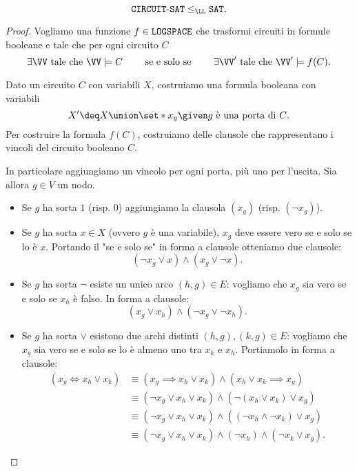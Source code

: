 \begin{theorem}
  \[
    \CSAT \leq_{\LL} \SAT.
  \]
\end{theorem}
\begin{proof}
  Vogliamo una funzione $f \in \texttt{LOGSPACE}$ che trasformi circuiti in formule booleane
  e tale che per ogni circuito $C$ \[
      \exists \VV \text{ tale che } \VV \models C 
      \qquad \text{ se e solo se } \qquad
      \exists \VV' \text{ tale che } \VV' \models f(C).
  \]

  Dato un circuito $C$ con variabili $X$, costruiamo una formula booleana con
  variabili \[
      X' \deq X \union \set*{x_g \given g \text{ è una porta di } C}.
  \] Per costruire la formula $f(C)$, costruiamo delle clausole che rappresentano
  i vincoli del circuito booleano $C$. 
  
  In particolare aggiungiamo un vincolo per ogni porta, più uno per l'uscita.
  Sia allora $g \in V$ un nodo.
  \begin{itemize}
    \item Se $g$ ha sorta $1$ (risp. $0$) aggiungiamo la clausola $(x_g)$
      (risp. $(\neg x_g)$).
    \item Se $g$ ha sorta $x \in X$ (ovvero $g$ è una variabile), $x_g$ deve 
      essere vero se e solo se lo è $x$. Portando il "se e solo se" in forma a
      clausole otteniamo due clausole: \[
          (\neg x_g \lor x) \land (x_g \lor \neg x).
      \]
    \item Se $g$ ha sorta $\neg$ esiste un unico arco $(h, g) \in E$: vogliamo
      che $x_g$ sia vero se e solo se $x_h$ è falso. In forma a clausole: \[
          (x_g \lor x_h) \land (\neg x_g \lor \neg x_h).
      \]
    \item Se $g$ ha sorta ${\lor}$ esistono due archi distinti $(h, g), 
      (k, g) \in E$: vogliamo che $x_g$ sia vero se e solo se lo è almeno uno tra
      $x_k$ e $x_h$. Portiamolo in forma a clausole: \begin{align*}
        (x_g \iff x_h \lor x_k) 
          &\equiv (x_g \implies x_h \lor x_k) \land (x_h \lor x_k \implies x_g)\\
          &\equiv (\neg x_g \lor x_h \lor x_k) \land (\neg (x_h \lor x_k) \lor x_g)\\
          &\equiv (\neg x_g \lor x_h \lor x_k) \land 
                  ((\neg x_h \land \neg x_k) \lor x_g)\\
          &\equiv (\neg x_g \lor x_h \lor x_k) \land 
                  (\neg x_h) \land (\neg x_k \lor x_g).
      \end{align*} 

\end{itemize}
\end{proof}
